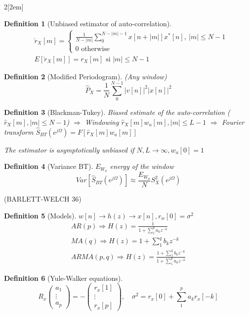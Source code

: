 \documentclass[leqno]{article}
\newtheorem*{definition}{Definition}
\begin{document}
\begin{multicols}{2}[\columnsep2em]
\begin{definition}[Unbiased estimator of auto-correlation]
\begin{align*}
  &\breve{r}_X[m]= \begin{cases}
    \frac{1}{N-|m|}\sum_0^{N-|m|-1}x[n+|m|]x^*[n],\ |m|\le N-1\\
	0 \text{ otherwise}
  \end{cases}\\
  &E[\breve{r}_X[m]]=r_X[m] \text{ si } |m|\le N-1
\end{align*}
\end{definition}

\begin{definition}[Modified Periodogram] (Any window)
\[
  \hat{P}_X=\frac{1}{N}\sum_{0}^{N-1}|v[n]|^2|x[n]|^2
\] 
\end{definition}

\begin{definition}[Blackman-Tukey]
Biased estimate of the auto-correlation ($\hat{r}_X[m], |m|\le N-1$) $\Rightarrow$ Windowing $\hat{r}_X[m]w_a[m], |m|\le L-1$ $\Rightarrow$ Fourier transform  $\hat{S}_{BT}(e^{j\Omega})=F[\hat{r}_X[m]w_a[m]]$ 

The estimator is asymptotically unbiased if $N, L\to \infty , w_a[0]=1$
\end{definition}

\begin{definition}[Variance BT] $E_{W_a}$ energy of the window
\[
Var[\hat{S}_{BT}(e^{j\Omega})] \approx \frac{E_{W_a}}{N}S^2_X(e^{j\Omega})
\] 
\end{definition}

(BARLETT-WELCH 36)
\begin{definition}[Models] $w[n] \rightarrow \boxed{h(z)} \rightarrow x[n], r_w[0]=\sigma ^2$
\begin{align*}
  AR(p) \Rightarrow H(z)=\frac{1}{1+\sum_{1}^{p}a_kz^{-k}}\\
  MA(q) \Rightarrow H(z) = 1+\sum_1^q b_kz^{-k}\\
  ARMA(p,q) \Rightarrow H(z) = \frac{1+\sum_1^q b_kz^{-k}}{1+\sum _1^pa_kz^{-k}}
\end{align*}
\end{definition}

\begin{definition}[Yule-Walker equations]
\[
R_x  \begin{pmatrix} a_1 \\ \vdots \\ a_p \end{pmatrix} = - \begin{pmatrix} r_x[1] \\ \vdots \\ r_x[p] \end{pmatrix} , \quad \sigma ^2 = r_x[0]+\sum_1^pa_kr_x[-k]
\] 
\end{definition}



\end{multicols}
\end{document}
